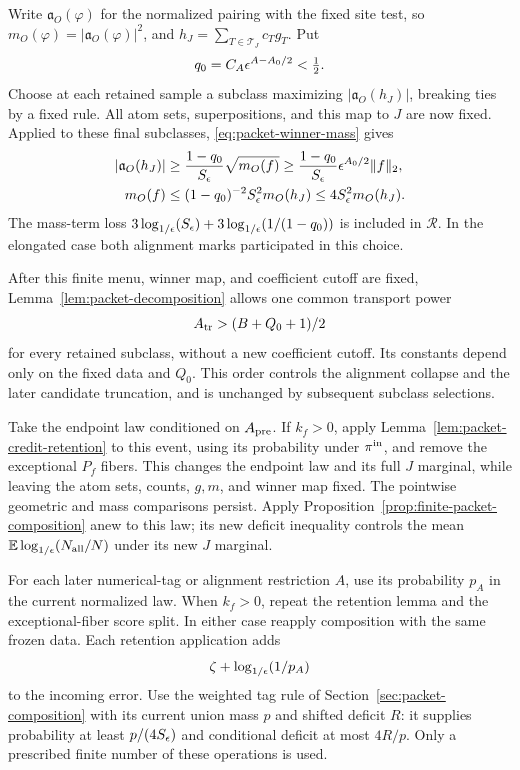 Write \(\mathfrak a_O(\varphi)\) for the normalized pairing with
the fixed site test, so \(m_O(\varphi)=|\mathfrak a_O(\varphi)|^2\),
and \(h_J=\sum_{T\in\mathcal T_J}c_Tg_T\).  Put
\[
 q_0=C_A\epsilon^{A-A_0/2}<\tfrac12.
\]
Choose at each retained sample a subclass maximizing
\(|\mathfrak a_O(h_J)|\), breaking ties by a fixed rule.  All atom
sets, superpositions, and this map to \(J\) are now fixed.  Applied
to these final subclasses, \eqref{eq:packet-winner-mass} gives
\begin{align}
 |\mathfrak a_O(h_J)|
 &\ge\frac{1-q_0}{S_\epsilon}\sqrt{m_O(f)}
 \ge\frac{1-q_0}{S_\epsilon}\epsilon^{A_0/2}\|f\|_2,
 \label{eq:repayment-winner-floor}\\
 m_O(f)&\le (1-q_0)^{-2}S_\epsilon^2m_O(h_J)
          \le4S_\epsilon^2m_O(h_J).
 \label{eq:repayment-original-winning}
\end{align}
The mass-term loss
\(3\log_{1/\epsilon}\!\left(S_\epsilon\right)+3\log_{1/\epsilon}\!\left(1/(1-q_0)\right)\) is included in
\(\mathcal R\).  In the elongated case both alignment marks
participated in this choice.

After this finite menu, winner map, and coefficient cutoff are fixed,
Lemma~\ref{lem:packet-decomposition} allows one common transport power
\begin{equation}
 A_{\rm tr}>(B+Q_0+1)/2
 \label{eq:repayment-transport-order}
\end{equation}
for every retained subclass, without a new coefficient cutoff.
Its constants depend only on the fixed data and \(Q_0\).  This
order controls the alignment collapse and the later candidate
truncation, and is unchanged by subsequent subclass selections.

Take the endpoint law conditioned on \(A_{\rm pre}\).  If \(k_f>0\),
apply Lemma~\ref{lem:packet-credit-retention} to this event, using
its probability under \(\pi^{\rm in}\), and remove the exceptional
\(P_f\) fibers.
This changes the endpoint law and its full \(J\) marginal, while
leaving the atom sets, counts, \(g,m\), and winner map fixed.
The pointwise geometric and mass comparisons persist.  Apply
Proposition~\ref{prop:finite-packet-composition} anew to this
law; its new deficit inequality controls the mean
\(\mathbb E\log_{1/\epsilon}\!\left(N_{\rm all}/N\right)\) under its new \(J\) marginal.

For each later numerical-tag or alignment restriction \(A\), use
its probability \(p_A\) in the current normalized law.  When
\(k_f>0\), repeat the retention lemma and the exceptional-fiber
score split.  In either case reapply composition with the same
frozen data.  Each retention application adds
\begin{equation}
 \zeta+\log_{1/\epsilon}\!\left(1/p_A\right)
 \label{eq:repayment-credit-cost}
\end{equation}
to the incoming error.  Use the weighted tag rule of
Section~\ref{sec:packet-composition} with its current union mass
\(p\) and shifted deficit \(R\): it supplies probability at least
\(p/(4S_\epsilon)\) and
conditional deficit at most \(4R/p\).  Only a prescribed finite
number of these operations is used.


